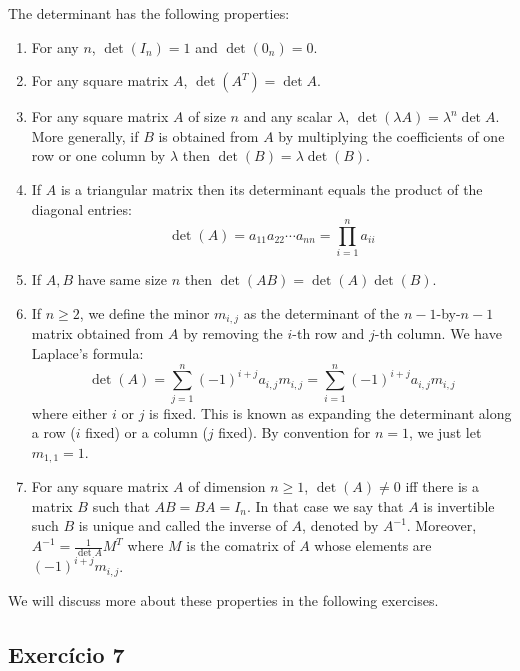 The determinant has the following properties:
\begin{enumerate}
\item For any $n$, $\det{(I_n)} = 1$ and $\det{(0_n)} = 0$.
\item For any square matrix $A$, $\det{(A^T)} = \det A$.
\item For any square matrix $A$ of size $n$ and any scalar $\lambda$,
  $\det{(\lambda A)} = \lambda^n \det A$. More generally, if $B$ is obtained
  from $A$ by multiplying the coefficients of one row or one column by
  $\lambda$ then $\det{(B)} = \lambda \det{(B)}$.
\item If $A$ is a triangular matrix then its determinant equals the
  product of the diagonal entries:
  $$ \det{(A)} = a_{11} a_{22} \cdots a_{nn} = \prod_{i=1}^n a_{ii}$$
\item If $A,B$ have same size $n$ then $\det{(A B)} = \det{(A)} \det{(B)}$.
\item If $n \geq 2$, we define the minor $m_{i,j}$ as the determinant of
        the $n-1$-by-$n-1$
        matrix obtained from $A$ by removing the $i$-th row and $j$-th column.
        We have Laplace's formula:
        $$\det(A) = \sum_{j=1}^n {(-1)}^{i+j} a_{i,j} m_{i,j}
        = \sum_{i=1}^n (-1)^{i+j} a_{i,j} m_{i,j}$$ where either $i$ or $j$
        is fixed. This is known as expanding the determinant along a row
        ($i$ fixed) or a column ($j$ fixed).
        By convention for $n = 1$, we just let $m_{1,1} = 1$.
\item For any square matrix $A$ of dimension $n \geq 1$,
  $\det(A) \neq 0$ iff there is a matrix $B$ such that $AB = BA = I_n$.
  In that case we say that $A$ is invertible such $B$ is unique and called
  the inverse of $A$, denoted by $A^{-1}$. Moreover,
  $A^{-1} = \frac{1}{\det{A}} M^T$ where $M$ is the comatrix of $A$ whose
  elements are ${(-1)}^{i+j}m_{i, j}$.
\end{enumerate}

We will discuss more about these properties in the following exercises.

\subsection*{Exercício 7}


